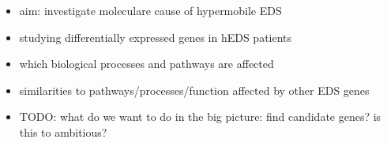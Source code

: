 \begin{itemize}
	\item aim: investigate moleculare cause of hypermobile EDS
	\item studying differentially expressed genes in hEDS patients
	\item which biological processes and pathways are affected
	\item similarities to pathways/processes/function affected by other EDS genes
	\item TODO: what do we want to do in the big picture: find candidate genes? is this to ambitious?
\end{itemize}